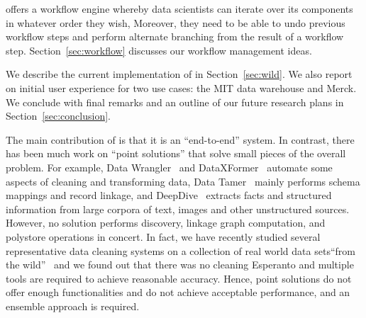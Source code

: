\stitle{[Workflow.]} 
\dcv offers a workflow engine whereby data scientists can iterate over its components in whatever order they wish,  Moreover, they need to be able to undo previous workflow steps and perform alternate branching from the result of a workflow step.  Section~\ref{sec:workflow} discusses our workflow management ideas.

\smallskip

We describe the current implementation of \dcv in Section~\ref{sec:wild}. We also report on initial user experience for two use cases: the MIT data warehouse and Merck. We conclude with final remarks and an outline of our future research plans in Section~\ref{sec:conclusion}.

\smallskip
The main contribution of \dcv is that it is an ``end-to-end'' system. In contrast, there has been much work on ``point solutions'' that solve small pieces of the overall problem. 
For example, 
Data Wrangler~\cite{2011-wrangler} and DataXFormer~\cite{DBLP:conf/icde/AbedjanMIOPS16} automate some aspects of cleaning and transforming data,  Data Tamer~\cite{DBLP:conf/cidr/StonebrakerBIBCZPX13} mainly performs schema mappings and record linkage,
and  DeepDive~\cite{DBLP:journals/pvldb/ShinWWSZR15} extracts facts and structured information from large corpora of text, images and other unstructured sources. 
However, no solution performs  discovery, linkage graph computation, and polystore operations in concert.
In fact, we have recently studied several representative data cleaning systems on a collection of real world data sets``from the wild''~\cite{DBLP:journals/pvldb/AbedjanCDFIOPST16} and we found out that there was no cleaning Esperanto and multiple tools are required to achieve reasonable accuracy.  
Hence, point solutions do not offer enough functionalities and do not achieve acceptable performance, 
and an ensemble approach is required.

